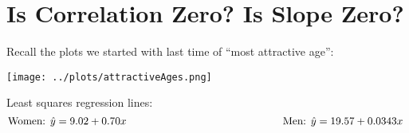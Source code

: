 \def\theTopic{Testing Slope = 0 }
\def\dayNum{18 }



\section{ Is Correlation Zero?  Is Slope Zero?}

Recall the plots we started with last time of ``most attractive age'':
\vspace{-.5cm}

\texttt{[image: ../plots/attractiveAges.png]}

Least squares regression lines:
$$ \mbox{Women: } \hat{y} = 9.02 + 0.70x \mbox{ \hspace{2in}}
   \mbox{Men: } \hat{y} = 19.57 + 0.0343x \mbox{ \vspace{-.7cm}} $$ 
